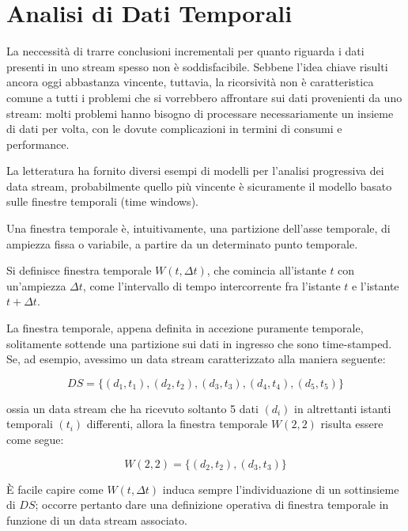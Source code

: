 \chapter{Analisi di Dati Temporali}

La neccessit{\`a} di trarre conclusioni incrementali per quanto riguarda i dati presenti in uno stream spesso non {\`e} soddisfacibile. Sebbene l'idea chiave risulti ancora oggi abbastanza vincente, tuttavia, la ricorsivit{\`a} non {\`e} caratteristica comune a tutti i problemi che si vorrebbero affrontare sui dati provenienti da uno stream: molti problemi hanno bisogno di processare necessariamente un insieme di dati per volta, con le dovute complicazioni in termini di consumi e performance.

La letteratura ha fornito diversi esempi di modelli per l'analisi progressiva dei data stream, probabilmente quello pi{\`u} vincente {\`e} sicuramente il modello basato sulle finestre temporali (time windows).

Una finestra temporale {\`e}, intuitivamente, una partizione dell'asse temporale, di ampiezza fissa o variabile, a partire da un determinato punto temporale.

\begin{defn}
Si definisce finestra temporale $W(t,\Delta t)$, che comincia all'istante \( t \) con un'ampiezza $\Delta t$, come l'intervallo di tempo intercorrente fra l'istante \( t \) e l'istante $t+\Delta t$.
\end{defn}

La finestra temporale, appena definita in accezione puramente temporale, solitamente sottende una partizione sui dati in ingresso che sono time-stamped. Se, ad esempio, avessimo un data stream caratterizzato alla maniera seguente:

\begin{equation}
DS = \lbrace (d_1,t_1),(d_2,t_2),(d_3,t_3),(d_4,t_4),(d_5,t_5) \rbrace
\end{equation}
 
ossia un data stream che ha ricevuto soltanto 5 dati \( (d_i) \) in altrettanti istanti temporali \( (t_i) \) differenti, allora la finestra temporale \( W(2,2) \) risulta essere come segue:

\begin{equation}
W(2,2) = \lbrace(d_2,t_2),(d_3,t_3)\rbrace
\end{equation}

{\`E} facile capire come $W(t,\Delta t)$ induca sempre l'individuazione di un sottinsieme di \( DS \); occorre pertanto dare una definizione operativa di finestra temporale in funzione di un data stream associato.

